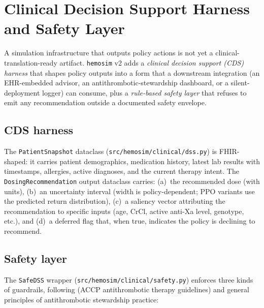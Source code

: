 \documentclass[11pt]{article}
\begin{document}
\section{Clinical Decision Support Harness and Safety Layer}
\label{sec:dss}

A simulation infrastructure that outputs policy actions is not yet a clinical-translation-ready artifact. \texttt{hemosim} v2 adds a \emph{clinical decision support (CDS) harness} that shapes policy outputs into a form that a downstream integration (an EHR-embedded advisor, an antithrombotic-stewardship dashboard, or a silent-deployment logger) can consume, plus a \emph{rule-based safety layer} that refuses to emit any recommendation outside a documented safety envelope.

\subsection{CDS harness}

The \texttt{PatientSnapshot} dataclass (\texttt{src/hemosim/clinical/dss.py}) is FHIR-shaped: it carries patient demographics, medication history, latest lab results with timestamps, allergies, active diagnoses, and the current therapy intent. The \texttt{DosingRecommendation} output dataclass carries: (a)~the recommended dose (with units), (b)~an uncertainty interval (width is policy-dependent; PPO variants use the predicted return distribution), (c)~a saliency vector attributing the recommendation to specific inputs (age, CrCl, active anti-Xa level, genotype, etc.), and (d)~a deferred flag that, when true, indicates the policy is declining to recommend.

\subsection{Safety layer}

The \texttt{SafeDSS} wrapper (\texttt{src/hemosim/clinical/safety.py}) enforces three kinds of guardrails, following \citet{holbrook2012} (ACCP antithrombotic therapy guidelines) and general principles of antithrombotic stewardship practice:
\end{document}
